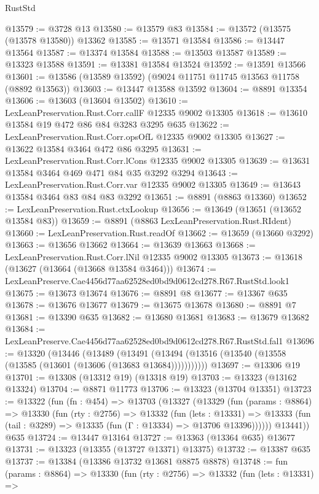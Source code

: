 \begin{lexlean}{RustStd}
\begin{coremodule}
@13579 := @3728 @13
@13580 := @13579 @83
@13584 := @13572 (@13575 (@13578 @13580)) @13362
@13585 := @13571 @13584
@13586 := @13447 @13564
@13587 := @13374 @13584
@13588 := @13503 @13587
@13589 := @13323 @13588
@13591 := @13381 @13584 @13524
@13592 := @13591 @13566
@13601 := @13586 (@13589 @13592) (@9024 @11751 @11745 @13563 @11758 (@8892 @13563))
@13603 := @13447 @13588 @13592
@13604 := @8891 @13354
@13606 := @13603 (@13604 @13502)
@13610 := LexLeanPreservation.Rust.Corr.callF @12335 @9002 @13305
@13618 := @13610 @13584 @19 @472 @86 @84 @3283 @3295 @635
@13622 := LexLeanPreservation.Rust.Corr.opsOfL @12335 @9002 @13305
@13627 := @13622 @13584 @3464 @472 @86 @3295
@13631 := LexLeanPreservation.Rust.Corr.lCons @12335 @9002 @13305
@13639 := @13631 @13584 @3464 @469 @471 @84 @35 @3292 @3294
@13643 := LexLeanPreservation.Rust.Corr.var @12335 @9002 @13305
@13649 := @13643 @13584 @3464 @83 @84 @83 @3292
@13651 := @8891 (@8863 @13360)
@13652 := LexLeanPreservation.Rust.ctxLookup
@13656 := @13649 (@13651 (@13652 @13584 @83))
@13659 := @8891 (@8863 LexLeanPreservation.Rust.RIdent)
@13660 := LexLeanPreservation.Rust.readOf
@13662 := @13659 (@13660 @3292)
@13663 := @13656 @13662
@13664 := @13639 @13663
@13668 := LexLeanPreservation.Rust.Corr.lNil @12335 @9002 @13305
@13673 := @13618 (@13627 (@13664 (@13668 @13584 @3464)))
@13674 := LexLeanPreserve.Cae4456d77aa62528ed0bd9d0612cd278.R67.RustStd.look1
@13675 := @13673 @13674
@13676 := @8891 @8
@13677 := @13367 @635
@13678 := @13676 @13677
@13679 := @13675 @13678
@13680 := @8891 @7
@13681 := @13390 @635
@13682 := @13680 @13681
@13683 := @13679 @13682
@13684 := LexLeanPreserve.Cae4456d77aa62528ed0bd9d0612cd278.R67.RustStd.fal1
@13696 := @13320
    (@13446
      (@13489
        (@13491 (@13494 (@13516 (@13540 (@13558 (@13585 (@13601 (@13606 (@13683 @13684)))))))))))
@13697 := @13306 @19
@13701 := @13308 (@13312 @19) (@13318 @19)
@13703 := @13323 (@13162 @13324)
@13704 := @8871 @11773
@13706 := @13323 (@13704 @13351)
@13723 := @13322
    (fun (fn : @454) =>
    @13703
      (@13327
        (@13329
          (fun (params : @8864) =>
          @13330
            (fun (rty : @2756) =>
            @13332
              (fun (lets : @13331) =>
              @13333 (fun (tail : @3289) => @13335 (fun (Γ : @13334) => @13706 @13396))))))
        @13441))
    @635
@13724 := @13447 @13164
@13727 := @13363 (@13364 @635) @13677
@13731 := @13323 (@13355 (@13727 @13371) @13375)
@13732 := @13387 @635
@13737 := @13384 (@13386 @13732 @13681 @8875 @8878)
@13748 := fun (params : @8864) =>
  @13330
    (fun (rty : @2756) =>
    @13332
      (fun (lets : @13331) =>

\end{coremodule}
\end{lexlean}
